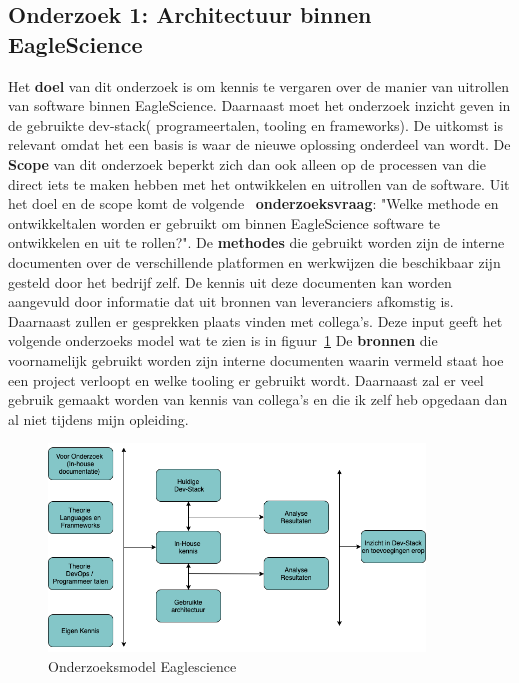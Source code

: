 \subsection{Onderzoek 1: Architectuur binnen EagleScience}\label{subsec:onderzoeksmethode-architectuur-binnen-eaglescience}
Het \textbf{doel} van dit onderzoek is om kennis te vergaren over de manier van uitrollen van software binnen EagleScience. Daarnaast moet het onderzoek inzicht geven in de gebruikte dev-stack( programeertalen, tooling en frameworks). De uitkomst is relevant omdat het een basis is waar de nieuwe oplossing onderdeel van wordt. De \textbf{Scope} van dit onderzoek beperkt zich dan ook alleen op de processen van die direct iets te maken hebben met het ontwikkelen en uitrollen van de software. Uit het doel en de scope komt de volgende ~\textbf{onderzoeksvraag}: "Welke methode en ontwikkeltalen worden er gebruikt om binnen EagleScience software te ontwikkelen en uit te rollen?". De \textbf{methodes} die gebruikt worden zijn de interne documenten over de verschillende platformen en werkwijzen die beschikbaar zijn gesteld door het bedrijf zelf. De kennis uit deze documenten kan worden aangevuld door informatie dat uit bronnen van leveranciers afkomstig is. Daarnaast zullen er gesprekken plaats vinden met collega's. Deze input geeft het volgende onderzoeks model wat te zien is in figuur~\ref{fig:OnderzoeksModelEaglescience}
De \textbf{bronnen} die voornamelijk gebruikt worden zijn interne documenten waarin vermeld staat hoe een project verloopt en welke tooling er gebruikt wordt. Daarnaast zal er veel gebruik gemaakt worden van kennis van collega's en die ik zelf heb opgedaan dan al niet tijdens mijn opleiding.
\begin{figure}[htbp]
    \myfloatalign
    \includegraphics[width=10cm]{gfx/OnderzoeksmodelES}
    \caption{Onderzoeksmodel Eaglescience}
    \label{fig:OnderzoeksModelEaglescience}
\end{figure}




